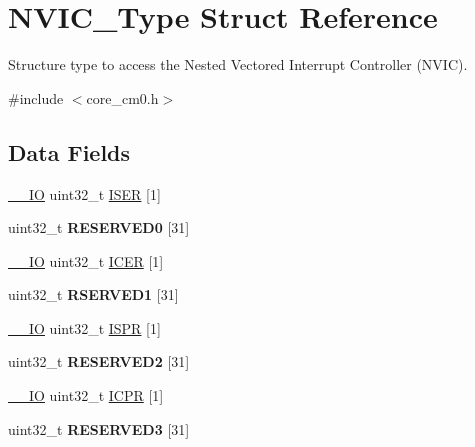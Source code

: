 \hypertarget{struct_n_v_i_c___type}{\section{N\-V\-I\-C\-\_\-\-Type Struct Reference}
\label{struct_n_v_i_c___type}
}


Structure type to access the Nested Vectored Interrupt Controller (N\-V\-I\-C).  




{\ttfamily \#include $<$core\-\_\-cm0.\-h$>$}

\subsection*{Data Fields}
\begin{DoxyCompactItemize}
\item 
\hyperlink{group___c_m_s_i_s__core__definitions_gaec43007d9998a0a0e01faede4133d6be}{\-\_\-\-\_\-\-I\-O} uint32\-\_\-t \hyperlink{struct_n_v_i_c___type_a95686b1da7037feece357d91ba5f5325}{I\-S\-E\-R} \mbox{[}1\mbox{]}
\item 
\hypertarget{struct_n_v_i_c___type_a148e6e212dc15628998e8f4239290665}{uint32\-\_\-t {\bfseries R\-E\-S\-E\-R\-V\-E\-D0} \mbox{[}31\mbox{]}}\label{struct_n_v_i_c___type_a148e6e212dc15628998e8f4239290665}

\item 
\hyperlink{group___c_m_s_i_s__core__definitions_gaec43007d9998a0a0e01faede4133d6be}{\-\_\-\-\_\-\-I\-O} uint32\-\_\-t \hyperlink{struct_n_v_i_c___type_a5524644c804c18c22addd691d4da53e4}{I\-C\-E\-R} \mbox{[}1\mbox{]}
\item 
\hypertarget{struct_n_v_i_c___type_a62ae13b33cd85ec43b6f84d85b7ea9c6}{uint32\-\_\-t {\bfseries R\-S\-E\-R\-V\-E\-D1} \mbox{[}31\mbox{]}}\label{struct_n_v_i_c___type_a62ae13b33cd85ec43b6f84d85b7ea9c6}

\item 
\hyperlink{group___c_m_s_i_s__core__definitions_gaec43007d9998a0a0e01faede4133d6be}{\-\_\-\-\_\-\-I\-O} uint32\-\_\-t \hyperlink{struct_n_v_i_c___type_ae3434eff1b1db4ce857c73a4ef1af273}{I\-S\-P\-R} \mbox{[}1\mbox{]}
\item 
\hypertarget{struct_n_v_i_c___type_a6e578ce633e8b80c70bc612a1bf8a965}{uint32\-\_\-t {\bfseries R\-E\-S\-E\-R\-V\-E\-D2} \mbox{[}31\mbox{]}}\label{struct_n_v_i_c___type_a6e578ce633e8b80c70bc612a1bf8a965}

\item 
\hyperlink{group___c_m_s_i_s__core__definitions_gaec43007d9998a0a0e01faede4133d6be}{\-\_\-\-\_\-\-I\-O} uint32\-\_\-t \hyperlink{struct_n_v_i_c___type_a281c819da5f0f4265f5b88d269544bc9}{I\-C\-P\-R} \mbox{[}1\mbox{]}
\item 
\hypertarget{struct_n_v_i_c___type_afbefcd166e59396eadde34d46bfc4539}{uint32\-\_\-t {\bfseries R\-E\-S\-E\-R\-V\-E\-D3} \mbox{[}31\mbox{]}}\label{struct_n_v_i_c___type_afbefcd166e59396eadde34d46bfc4539}


\end{DoxyCompactItemize}
